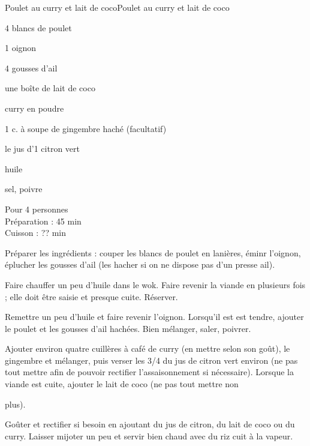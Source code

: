 \begin{recette}{Poulet au curry et lait de coco}{Poulet au curry et lait de coco}

\begin{ingredients}
4 blancs de poulet \par
1 oignon \par
4 gousses d'ail\par
une boîte de lait de coco\par
curry en poudre\par
1 c. à soupe de gingembre haché (facultatif)\par
le jus d'1 citron vert\par
huile\par
sel, poivre\par
\end{ingredients}

\begin{infos}
Pour 4 personnes\\
Préparation : 45 min\\
Cuisson : ?? min\\
\end{infos}

\begin{etapes}
\item Préparer les ingrédients : couper les blancs de poulet en lanières, éminr l'oignon, éplucher les gousses d'ail (les hacher si on ne dispose pas d'un presse ail).
\item Faire chauffer un peu d'huile dans le wok. Faire revenir la viande en plusieurs fois ; elle doit être saisie et presque cuite. Réserver.
\item Remettre un peu d'huile et faire revenir l'oignon. Lorsqu'il est est tendre, ajouter le poulet et les gousses d'ail hachées. Bien mélanger, saler, poivrer.
\item Ajouter environ quatre cuillères à café de curry (en mettre selon son goût), le gingembre et mélanger, puis verser les 3/4 du jus de citron vert environ (ne pas tout mettre afin de pouvoir rectifier l'assaisonnement si nécessaire). Lorsque la viande est cuite, ajouter le lait de coco (ne pas tout mettre non
\item plus).
\item Goûter et rectifier si besoin en ajoutant du jus de citron, du lait de coco ou du curry. Laisser mijoter un peu et servir bien chaud avec du riz cuit à la vapeur.
\end{etapes}

\end{recette}